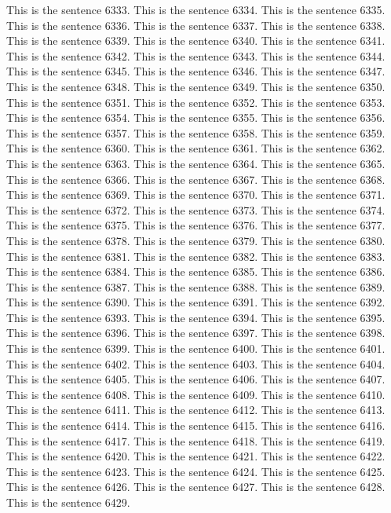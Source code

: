 \documentclass{article}
\begin{document}
This is the sentence 6333.
This is the sentence 6334.
This is the sentence 6335.
This is the sentence 6336.
This is the sentence 6337.
This is the sentence 6338.
This is the sentence 6339.
This is the sentence 6340.
This is the sentence 6341.
This is the sentence 6342.
This is the sentence 6343.
This is the sentence 6344.
This is the sentence 6345.
This is the sentence 6346.
This is the sentence 6347.
This is the sentence 6348.
This is the sentence 6349.
This is the sentence 6350.
This is the sentence 6351.
This is the sentence 6352.
This is the sentence 6353.
This is the sentence 6354.
This is the sentence 6355.
This is the sentence 6356.
This is the sentence 6357.
This is the sentence 6358.
This is the sentence 6359.
This is the sentence 6360.
This is the sentence 6361.
This is the sentence 6362.
This is the sentence 6363.
This is the sentence 6364.
This is the sentence 6365.
This is the sentence 6366.
This is the sentence 6367.
This is the sentence 6368.
This is the sentence 6369.
This is the sentence 6370.
This is the sentence 6371.
This is the sentence 6372.
This is the sentence 6373.
This is the sentence 6374.
This is the sentence 6375.
This is the sentence 6376.
This is the sentence 6377.
This is the sentence 6378.
This is the sentence 6379.
This is the sentence 6380.
This is the sentence 6381.
This is the sentence 6382.
This is the sentence 6383.
This is the sentence 6384.
This is the sentence 6385.
This is the sentence 6386.
This is the sentence 6387.
This is the sentence 6388.
This is the sentence 6389.
This is the sentence 6390.
This is the sentence 6391.
This is the sentence 6392.
This is the sentence 6393.
This is the sentence 6394.
This is the sentence 6395.
This is the sentence 6396.
This is the sentence 6397.
This is the sentence 6398.
This is the sentence 6399.
This is the sentence 6400.
This is the sentence 6401.
This is the sentence 6402.
This is the sentence 6403.
This is the sentence 6404.
This is the sentence 6405.
This is the sentence 6406.
This is the sentence 6407.
This is the sentence 6408.
This is the sentence 6409.
This is the sentence 6410.
This is the sentence 6411.
This is the sentence 6412.
This is the sentence 6413.
This is the sentence 6414.
This is the sentence 6415.
This is the sentence 6416.
This is the sentence 6417.
This is the sentence 6418.
This is the sentence 6419.
This is the sentence 6420.
This is the sentence 6421.
This is the sentence 6422.
This is the sentence 6423.
This is the sentence 6424.
This is the sentence 6425.
This is the sentence 6426.
This is the sentence 6427.
This is the sentence 6428.
This is the sentence 6429.
\end{document}
